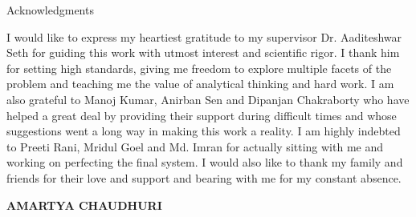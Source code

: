 \begin{center}
\LARGE{Acknowledgments}  %
\end{center}

\vspace{0.5in}

I would like to express my heartiest gratitude to my supervisor Dr. Aaditeshwar Seth for guiding this work with utmost interest and scientific rigor. I thank him for setting high standards, giving me freedom to explore multiple facets of the problem and teaching me the value of analytical thinking and hard work. I am also grateful to Manoj Kumar, Anirban Sen and Dipanjan Chakraborty who have helped a great deal by providing their support during difficult times and whose suggestions went a long way in making this work a reality. I am highly indebted to Preeti Rani, Mridul Goel and Md. Imran for actually sitting with me and working on perfecting the final system. I would also like to thank my family and friends for their love and support and bearing with me for my constant absence.\\

\vspace{1.5in}

{\bfseries AMARTYA CHAUDHURI}

